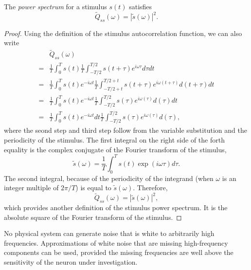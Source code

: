 \begin{prop}
  \label{prop:aliasForPowerSpectrum}
  The \emph{power spectrum} for a stimulus $s(t)$ satisfies
  \begin{equation}
    \label{equ:1.44}
    \widetilde{Q}_{ss}(\omega) = |\widetilde{s}(\omega)|^2.
  \end{equation}
\end{prop}
\begin{proof}
  Using the definition of the stimulus autocorrelation function, we can also write
  \begin{displaymath}        
    \begin{aligned}
      \label{equ:1.42}
      &\widetilde{Q}_{ss}(\omega) \\
      =& \frac{1}{T} \int_0^T s(t) \frac{1}{T}\int_{-T/2}^{T/2} s(t+\tau)e^{i\omega\tau} d\tau dt \\
      =& \frac{1}{T} \int_0^T s(t)e^{-i\omega t} \frac{1}{T}\int_{-T/2+t}^{T/2+t}s(t+\tau)e^{i\omega(t+\tau)}d(t+\tau)dt\\
      =& \frac{1}{T} \int_0^T s(t)e^{-i\omega t} \frac{1}{T}\int_{-T/2}^{T/2}s(\tau)e^{i\omega(\tau)}d(\tau)dt\\
      =& \frac{1}{T} \int_0^T s(t)e^{-i\omega t}dt \frac{1}{T}\int_{-T/2}^{T/2}s(\tau)e^{i\omega(\tau)}d(\tau),
    \end{aligned}
  \end{displaymath}
  where the seond step and third step follow from the variable substitution and the periodicity of the stimulus.
  The first integral on the right side of the forth equality is the complex conjugate of the Fourier transform of the stimulus,
  \begin{equation}
    \label{equ:1.43}
    \widetilde{s}(\omega) = \frac{1}{T} \int_0^Ts(t)\exp(i\omega \tau)d\tau.
  \end{equation}
  The second integral, because of the periodicity of the integrand (when $\omega$ is an integer multiple of $2\pi / T$) is equal to $\widetilde{s}(\omega)$. Therefore,
  \begin{equation}
    \label{equ:1.44}
    \widetilde{Q}_{ss}(\omega) = |\widetilde{s}(\omega)|^2,
  \end{equation}
  which provides another definition of the stimulus power spectrum. It is the absolute square of the Fourier transform of the stimulus.
\end{proof}

\begin{rem}
  No physical system can generate noise that is white to arbitrarily high frequencies. Approximations of white noise that are missing high-frequency components can be used, provided the missing frequencies are well above the sensitivity of the neuron under investigation.
\end{rem}

